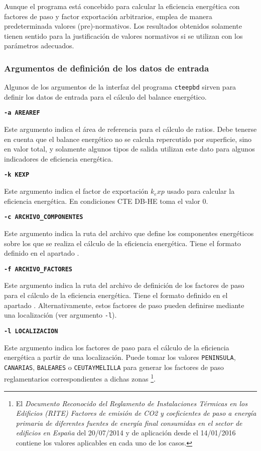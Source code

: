 \documentclass[10pt,notitlepage,oneside,a4paper]{article}
\begin{document}

\begin{myquote}\footnotesize
Aunque el programa está concebido para calcular la eficiencia energética con factores de paso y factor exportación arbitrarios, emplea de manera predeterminada valores (pre)-normativos. Los resultados obtenidos solamente tienen sentido para la justificación de valores normativos si se utilizan con los parámetros adecuados.
\end{myquote}

\subsubsection{Argumentos de definición de los datos de entrada}

Algunos de los argumentos de la interfaz del programa \texttt{cteepbd} sirven para definir los datos de entrada para el cálculo del balance energético.

\textbf{\texttt{-a AREAREF}}

Este argumento indica el área de referencia para el cálculo de ratios. Debe tenerse en cuenta que el balance energético no se calcula repercutido por superficie, sino en valor total, y solamente algunos tipos de salida utilizan este dato para algunos indicadores de eficiencia energética.

\textbf{\texttt{-k KEXP}}

Este argumento indica el factor de exportación $k_exp$ usado para calcular la eficiencia energética. En condiciones CTE DB-HE toma el valor 0.

\textbf{\texttt{-c ARCHIVO\_COMPONENTES}}

Este argumento indica la ruta del archivo que define los componentes energéticos sobre los que se realiza el cálculo de la eficiencia energética. Tiene el formato definido en el apartado .

\textbf{\texttt{-f ARCHIVO\_FACTORES}}

Este argumento indica la ruta del archivo de definición de los factores de paso para el cálculo de la eficiencia energética. Tiene el formato definido en el apartado .
Alternativamente, estos factores de paso pueden definirse mediante una localización (ver argumento \texttt{-l}).

\textbf{\texttt{-l LOCALIZACION}}

Este argumento indica los factores de paso para el cálculo de la eficiencia energética a partir de una localización. Puede tomar los valores \texttt{PENINSULA}, \texttt{CANARIAS}, \texttt{BALEARES} o \texttt{CEUTAYMELILLA} para generar los factores de paso reglamentarios correspondientes a dichas zonas \footnote{El \textit{Documento Reconocido del Reglamento de Instalaciones Térmicas en los Edificios (RITE) Factores de emisión de CO2 y coeficientes de paso a energía primaria de diferentes fuentes de energía final consumidas en el sector de edificios en España} del 20/07/2014 y de aplicación desde el 14/01/2016 contiene los valores aplicables en cada uno de los casos.}.
\end{document}
